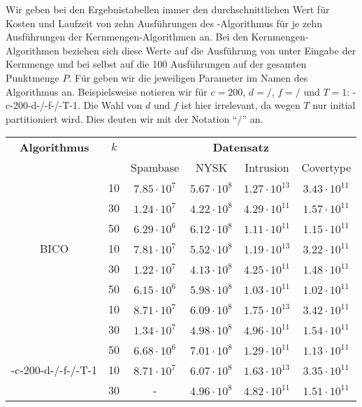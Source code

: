 Wir geben bei den Ergebnistabellen immer den durchschnittlichen Wert für Kosten und Laufzeit von zehn
Ausführungen des \kmpp-Algorithmus für je zehn Ausführungen der Kernmengen-Algorithmen an. Bei den Kernmengen-Algorithmen
beziehen sich diese Werte auf die Ausführung von \kmpp{} unter
Eingabe der Kernmenge und bei \kmpp{} selbst auf die 100 Ausführungen auf der gesamten Punktmenge $P$. Für \CsTwo{} geben wir die
jeweiligen Parameter im Namen des Algorithmus an. Beispielsweise notieren wir für $c = 200$, $d=/$, $f=/$ und $T=1$:
\CsTwo-c-200-d-/-f-/-T-1. Die Wahl von $d$ und $f$ ist hier irrelevant, da wegen $T$ nur initial partitioniert wird.
Dies deuten wir mit der Notation "`/"' an.
\newpage
\begin{table}[h]
\centering
\begin{tabular}{@{}cccccc@{}} \toprule
	\textbf{Algorithmus} & $k$ & \multicolumn{4}{c}{\textbf{Datensatz}} \\
	\cmidrule(r){3-6} & 		& Spambase 				& NYSK 				& Intrusion 			& Covertype \\ \toprule
	\Skmpp 						& 10 & $7.85 \cdot 10^7$ & $5.67 \cdot 10^8$ & $1.27 \cdot 10^{13}$ & $3.43 \cdot 10^{11}$ \\
		 						& 30 & $1.24 \cdot 10^7$ & $4.22 \cdot 10^8$ & $4.29 \cdot 10^{11}$ & $1.57 \cdot 10^{11}$ \\
		 						& 50 & $6.29 \cdot 10^6$ & $6.12 \cdot 10^8$ & $1.11 \cdot 10^{11}$ & $1.15 \cdot 10^{11}$ \\
	\midrule
	BICO 						& 10 & $7.81 \cdot 10^7$ & $5.52 \cdot 10^8$ & $1.19 \cdot 10^{13}$ & $3.22 \cdot 10^{11}$ \\
			 					& 30 & $1.22 \cdot 10^7$ & $4.13 \cdot 10^8$ & $4.25 \cdot 10^{11}$ & $1.48 \cdot 10^{11}$ \\
		 						& 50 & $6.15 \cdot 10^6$ & $5.98 \cdot 10^8$ & $1.03 \cdot 10^{11}$ & $1.02 \cdot 10^{11}$ \\
	\midrule
	\kmpp 						& 10 & $8.71 \cdot 10^7$ & $6.09 \cdot 10^8$ & $1.75 \cdot 10^{13}$ & $3.42 \cdot 10^{11}$ \\
			 					& 30 & $1.34 \cdot 10^7$ & $4.98 \cdot 10^8$ & $4.96 \cdot 10^{11}$ & $1.54 \cdot 10^{11}$ \\
		 						& 50 & $6.68 \cdot 10^6$ & $7.01 \cdot 10^8$ & $1.29 \cdot 10^{11}$ & $1.13 \cdot 10^{11}$ \\
	\midrule
	\CsTwo-c-200-d-/-f-/-T-1	& 10 & $8.71 \cdot 10^7$ & $6.07 \cdot 10^8$ & $1.63 \cdot 10^{13}$ & $3.35 \cdot 10^{11}$ \\
			 					& 30 & - 				& $4.96 \cdot 10^8$ & $4.82 \cdot 10^{11}$ & $1.51 \cdot 10^{11}$ \\

\end{tabular}
\end{table}
